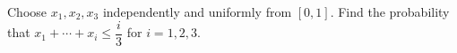 Choose $x_1,x_2,x_3$ independently and uniformly from $[0,1]$. Find the probability that $x_1+\cdots+x_i\le \dfrac{i}{3}$ for $i=1,2,3$.
